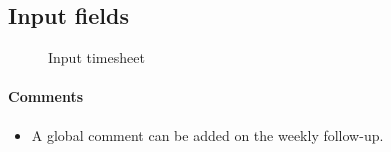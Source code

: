 \documentclass[letterpaper,10pt,english]{sphinxmanual}
\begin{document}
\subsection{Input fields}
\label{RealWorkAllocation:input-fields}\label{RealWorkAllocation:rwa-input-timesheet-label}\begin{figure}[htbp]
\centering
\capstart

\caption{Input timesheet}\end{figure}
\paragraph{Comments}
\begin{itemize}
\item {} 
A global comment can be added on the weekly follow-up. 

\end{itemize}
\end{document}
